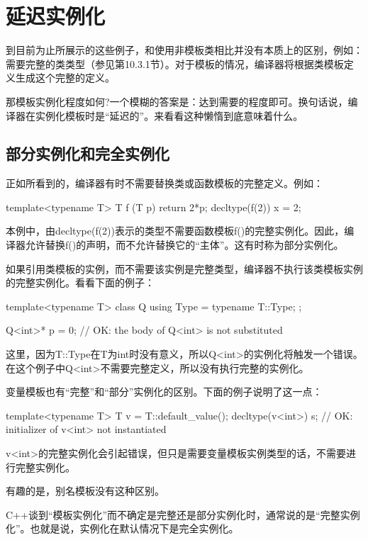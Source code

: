 \section{延迟实例化}

到目前为止所展示的这些例子，和使用非模板类相比并没有本质上的区别，例如：需要完整的类类型（参见第10.3.1节）。对于模板的情况，编译器将根据类模板定义生成这个完整的定义。

那模板实例化程度如何?一个模糊的答案是：达到需要的程度即可。换句话说，编译器在实例化模板时是“延迟的”。来看看这种懒惰到底意味着什么。

\subsection{部分实例化和完全实例化}

正如所看到的，编译器有时不需要替换类或函数模板的完整定义。例如：

\begin{cpp}
template<typename T> T f (T p) { return 2*p; }
decltype(f(2)) x = 2;
\end{cpp}

本例中，由decltype(f(2))表示的类型不需要函数模板f()的完整实例化。因此，编译器允许替换f()的声明，而不允许替换它的“主体”。这有时称为部分实例化。

如果引用类模板的实例，而不需要该实例是完整类型，编译器不执行该类模板实例的完整实例化。看看下面的例子：

\begin{cpp}
template<typename T> class Q {
	using Type = typename T::Type;
};

Q<int>* p = 0; // OK: the body of Q<int> is not substituted
\end{cpp}

这里，因为T::Type在T为int时没有意义，所以Q<int>的实例化将触发一个错误。在这个例子中Q<int>不需要完整定义，所以没有执行完整的实例化。

变量模板也有“完整”和“部分”实例化的区别。下面的例子说明了这一点：

\begin{cpp}
template<typename T> T v = T::default_value();
decltype(v<int>) s; // OK: initializer of v<int> not instantiated
\end{cpp}

v<int>的完整实例化会引起错误，但只是需要变量模板实例类型的话，不需要进行完整实例化。

有趣的是，别名模板没有这种区别。

C++谈到“模板实例化”而不确定是完整还是部分实例化时，通常说的是“完整实例化”。也就是说，实例化在默认情况下是完全实例化。

